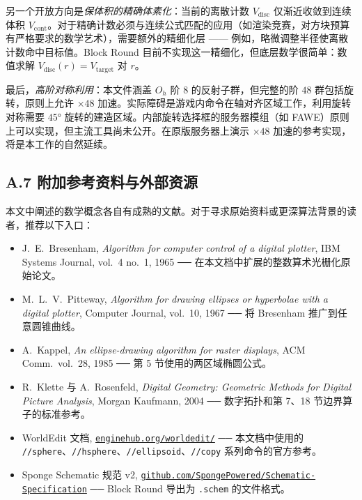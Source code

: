\documentclass[12pt,a4paper]{scrartcl}
\newcommand{\code}[1]{\texttt{\small #1}}
\newcommand{\cmd}[1]{\textcolor{earth}{\texttt{\small #1}}}
\newcommand{\biblink}[2]{\href{#1}{\nolinkurl{#2}}}
\begin{document}
另一个开放方向是\emph{保体积的精确体素化}：当前的离散计数 $V_{\mathrm{disc}}$ 仅渐近收敛到连续体积 $V_{\mathrm{cont}}$。对于精确计数必须与连续公式匹配的应用（如渲染竞赛，对方块预算有严格要求的数学艺术），需要额外的精细化层 —— 例如，略微调整半径使离散计数命中目标值。Block Round 目前不实现这一精细化，但底层数学很简单：数值求解 $V_{\mathrm{disc}}(r) = V_{\mathrm{target}}$ 对 $r$。

最后，\emph{高阶对称利用}：本文件涵盖 $O_h$ 阶 $8$ 的反射子群，但完整的阶 $48$ 群包括旋转，原则上允许 $\times 48$ 加速。实际障碍是游戏内命令在轴对齐区域工作，利用旋转对称需要 $45°$ 旋转的建造区域。内部旋转选择框的服务器模组（如 FAWE）原则上可以实现，但主流工具尚未公开。在原版服务器上演示 $\times 48$ 加速的参考实现，将是本工作的自然延续。

\subsection*{A.7 附加参考资料与外部资源}

本文中阐述的数学概念各自有成熟的文献。对于寻求原始资料或更深算法背景的读者，推荐以下入口：

\begin{itemize}[leftmargin=1.4em,itemsep=0.2em,topsep=0.3em]
  \item J.~E.~Bresenham, \emph{Algorithm for computer control of a digital plotter}, IBM Systems Journal, vol.~4 no.~1, 1965 ── 在本文档中扩展的整数算术光栅化原始论文。
  \item M.~L.~V.~Pitteway, \emph{Algorithm for drawing ellipses or hyperbolae with a digital plotter}, Computer Journal, vol.~10, 1967 ── 将 Bresenham 推广到任意圆锥曲线。
  \item A.~Kappel, \emph{An ellipse-drawing algorithm for raster displays}, ACM Comm.\ vol.~28, 1985 ── 第 5 节使用的两区域椭圆公式。
  \item R.~Klette 与 A.~Rosenfeld, \emph{Digital Geometry: Geometric Methods for Digital Picture Analysis}, Morgan Kaufmann, 2004 ── 数字拓扑和第 7、18 节边界算子的标准参考。
  \item WorldEdit 文档, \biblink{https://enginehub.org/worldedit/}{enginehub.org/worldedit/} ── 本文档中使用的 \cmd{//sphere}、\cmd{//hsphere}、\cmd{//ellipsoid}、\cmd{//copy} 系列命令的官方参考。
  \item Sponge Schematic 规范 v2, \biblink{https://github.com/SpongePowered/Schematic-Specification}{github.com/SpongePowered/Schematic-Specification} ── Block Round 导出为 \code{.schem} 的文件格式。
\end{itemize}
\end{document}
